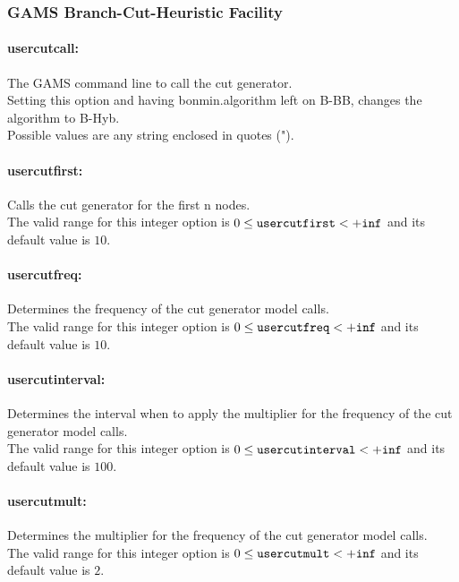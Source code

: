 \subsubsection{GAMS Branch-Cut-Heuristic Facility}
\label{sec:GAMS_Branch-Cut-Heuristic_Facility}

\paragraph{usercutcall:}\label{sec:usercutcall} The GAMS command line to call the cut generator. $\;$ \\
Setting this option and having bonmin.algorithm left on B-BB, changes the algorithm to B-Hyb.\\
Possible values are any string enclosed in quotes (").

\paragraph{usercutfirst:}\label{sec:usercutfirst} Calls the cut generator for the first n nodes. $\;$ \\
 The valid range for this integer option is
$0 \le {\tt usercutfirst } <  {\tt +inf}$
and its default value is $10$.


\paragraph{usercutfreq:}\label{sec:usercutfreq} Determines the frequency of the cut generator model calls. $\;$ \\
 The valid range for this integer option is
$0 \le {\tt usercutfreq } <  {\tt +inf}$
and its default value is $10$.


\paragraph{usercutinterval:}\label{sec:usercutinterval} Determines the interval when to apply the multiplier for the frequency of the cut generator model calls. $\;$ \\
 The valid range for this integer option is
$0 \le {\tt usercutinterval } <  {\tt +inf}$
and its default value is $100$.


\paragraph{usercutmult:}\label{sec:usercutmult} Determines the multiplier for the frequency of the cut generator model calls. $\;$ \\
 The valid range for this integer option is
$0 \le {\tt usercutmult } <  {\tt +inf}$
and its default value is $2$.


